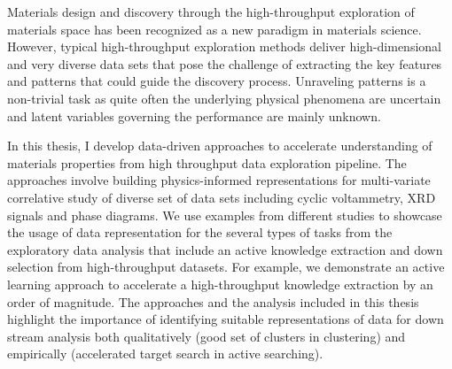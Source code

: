 Materials design and discovery through the high-throughput exploration of materials space has been recognized as a new paradigm in materials science. However, typical high-throughput exploration methods deliver high-dimensional and very diverse data sets that pose the challenge of extracting the key features and patterns that could guide the discovery process. Unraveling patterns is a non-trivial task as quite often the underlying physical phenomena are uncertain and latent variables governing the performance are mainly unknown. 

In this thesis, I develop data-driven approaches to accelerate understanding of materials properties from high throughput data exploration pipeline.
The approaches involve building physics-informed representations for multi-variate correlative study of diverse set of data sets including cyclic voltammetry, XRD signals and phase diagrams. 
We use examples from different studies to showcase the usage of data representation for the several types of tasks from the exploratory data analysis that include an active knowledge extraction and down selection from high-throughput datasets. 
For example, we demonstrate an active learning approach to accelerate a high-throughput knowledge extraction by an order of magnitude. 
The approaches and the analysis included in this thesis highlight the importance of identifying suitable representations of data for down stream analysis both qualitatively (good set of clusters in clustering) and empirically (accelerated target search in active searching). 


